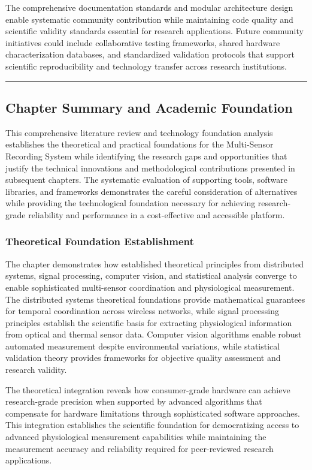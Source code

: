 \documentclass[12pt,a4paper]{article}
\begin{document}
The comprehensive documentation standards and modular architecture design enable systematic community contribution while
maintaining code quality and scientific validity standards essential for research applications. Future community
initiatives could include collaborative testing frameworks, shared hardware characterization databases, and standardized
validation protocols that support scientific reproducibility and technology transfer across research institutions.

\hrule

\subsection{Chapter Summary and Academic Foundation}

This comprehensive literature review and technology foundation analysis establishes the theoretical and practical
foundations for the Multi-Sensor Recording System while identifying the research gaps and opportunities that justify the
technical innovations and methodological contributions presented in subsequent chapters. The systematic evaluation of
supporting tools, software libraries, and frameworks demonstrates the careful consideration of alternatives while
providing the technological foundation necessary for achieving research-grade reliability and performance in a
cost-effective and accessible platform.

\subsubsection{Theoretical Foundation Establishment}

The chapter demonstrates how established theoretical principles from distributed systems, signal processing, computer
vision, and statistical analysis converge to enable sophisticated multi-sensor coordination and physiological
measurement. The distributed systems theoretical foundations provide mathematical guarantees for temporal coordination
across wireless networks, while signal processing principles establish the scientific basis for extracting physiological
information from optical and thermal sensor data. Computer vision algorithms enable robust automated measurement despite
environmental variations, while statistical validation theory provides frameworks for objective quality assessment and
research validity.

The theoretical integration reveals how consumer-grade hardware can achieve research-grade precision when supported by
advanced algorithms that compensate for hardware limitations through sophisticated software approaches. This integration
establishes the scientific foundation for democratizing access to advanced physiological measurement capabilities while
maintaining the measurement accuracy and reliability required for peer-reviewed research applications.
\end{document}
